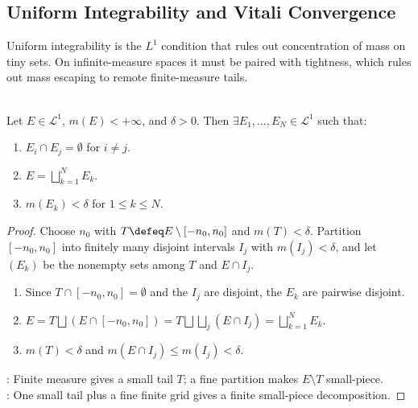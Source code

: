 \subsection{Uniform Integrability and Vitali Convergence}

Uniform integrability is the $L^1$ condition that rules out concentration of mass on tiny sets. On infinite-measure spaces it must be paired with tightness, which rules out mass escaping to remote finite-measure tails.

\begin{lemma} \label{lem:finite-measure-lebesgue-small-piece-decomposition} \\
Let $E\in\mathcal{L}^1$, $m(E)<+\infty$, and $\delta>0$. Then $\exists E_1,\ldots,E_N\in\mathcal{L}^1$ such that:
\begin{enumerate}[label=(\roman*)]
\setlength{\itemsep}{0pt}
\item $E_i\cap E_j=\emptyset$ for $i\neq j$.
\item $E=\bigsqcup\limits_{k=1}^NE_k$.
\item $m(E_k)<\delta$ for $1\leq k\leq N$.
\end{enumerate}
\begin{proof}
Choose $n_0$ with $T\defeq E\setminus[-n_0,n_0]$ and $m(T)<\delta$. Partition $[-n_0,n_0]$ into finitely many disjoint intervals $I_j$ with $m(I_j)<\delta$, and let $(E_k)$ be the nonempty sets among $T$ and $E\cap I_j$.
\begin{enumerate}[label=(\roman*)]
\setlength{\itemsep}{0pt}
\item Since $T\cap[-n_0,n_0]=\emptyset$ and the $I_j$ are disjoint, the $E_k$ are pairwise disjoint.
\item $E=T\bigsqcup(E\cap[-n_0,n_0])=T\bigsqcup\bigsqcup_j(E\cap I_j)=\bigsqcup\limits_{k=1}^NE_k$.
\item $m(T)<\delta$ and $m(E\cap I_j)\leq m(I_j)<\delta$.
\end{enumerate}
: Finite measure gives a small tail $T$; a fine partition makes $E\setminus T$ small-piece.\\
: One small tail plus a fine finite grid gives a finite small-piece decomposition.
\end{proof}
\end{lemma}


